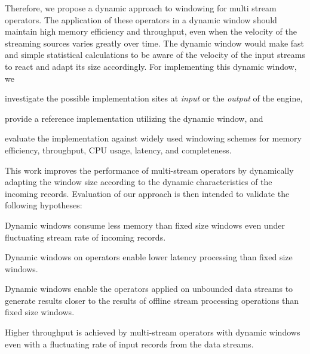Therefore, we propose a dynamic approach to windowing for multi stream operators.
The application of these operators in a dynamic window should maintain high memory efficiency and throughput,
even when the velocity of the streaming sources varies greatly over time. 
The dynamic window would make fast and simple statistical calculations to be 
aware of the velocity of the input streams to react and adapt its size accordingly. 
For implementing this dynamic window, we 
\renewcommand{\labelenumi}{(\roman{enumi})}
\begin{enumerate*}
    \item investigate the possible implementation sites at \emph{input}
    or the \emph{output} of the engine, 
    \item provide a reference implementation utilizing the dynamic window, and 
    \item evaluate the implementation against widely used windowing schemes for 
    memory efficiency, throughput, CPU usage, latency, and completeness. 
\end{enumerate*}


This work improves the performance of multi-stream operators 
by dynamically adapting the window size according to the dynamic characteristics
of the incoming records. Evaluation of 
our approach is then intended to validate the following hypotheses: 

\begin{hyp}
    Dynamic windows consume less memory than 
    fixed size windows even under fluctuating 
    stream rate of incoming records. 
\end{hyp}

\begin{hyp}
    Dynamic windows on operators enable lower latency 
    processing than fixed size windows. 
\end{hyp}

\begin{hyp}
    Dynamic windows enable the operators applied on
    unbounded data streams to generate 
    results closer to the results of offline stream processing operations
    than fixed size windows. 
\end{hyp}
\begin{hyp}
    Higher throughput is achieved by multi-stream operators 
    with dynamic windows even with a fluctuating
    rate of input records from the data streams.
\end{hyp}



